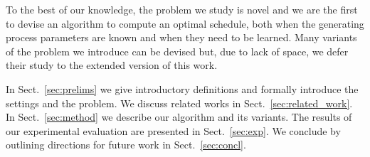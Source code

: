 To the best of our knowledge, the problem we study is novel and we are the first
to devise an algorithm to compute an optimal schedule, both when the generating
process parameters are known and when they need to be learned. Many variants
of the problem we introduce can be devised but, due to lack of space, we defer
their study to the extended version of this work.

 In Sect.~\ref{sec:prelims} we give introductory
definitions and formally introduce the settings and the problem. We discuss
related works in Sect.~\ref{sec:related_work}. In Sect.~\ref{sec:method} we
describe our algorithm \algoname and its variants. The results of our
experimental evaluation are presented in Sect.~\ref{sec:exp}. We conclude by
outlining directions for future work in Sect.~\ref{sec:concl}.
